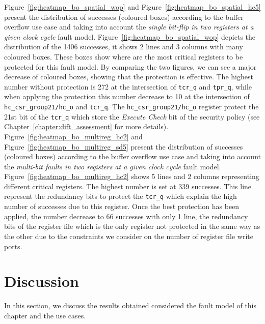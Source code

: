 Figure~\ref{fig:heatmap_bo_spatial_wop} and Figure~\ref{fig:heatmap_bo_spatial_hc5} present the distribution of successes (coloured boxes) according to the buffer overflow use case and taking into account the \textit{single bit-flip in two registers at a given clock cycle} fault model. Figure~\ref{fig:heatmap_bo_spatial_wop} depicts the distribution of the 1406 successes, it shows 2 lines and 3 columns with many coloured boxes. These boxes show where are the most critical registers to be protected for this fault model. By comparing the two figures, we can see a major decrease of coloured boxes, showing that the protection is effective. The highest number without protection is 272 at the intersection of \texttt{tcr\_q} and \texttt{tpr\_q}, while when applying the protection this number decrease to 10 at the intersection of \texttt{hc\_csr\_group21/hc\_o} and \texttt{tcr\_q}. The \texttt{hc\_csr\_group21/hc\_o} register protect the 21st bit of the \texttt{tcr\_q} which store the \textit{Execute Check} bit of the security policy (see Chapter~\ref{chapter:dift_assessment} for more details).
Figure~\ref{fig:heatmap_bo_multireg_hc2} and Figure~\ref{fig:heatmap_bo_multireg_sd5} present the distribution of successes (coloured boxes) according to the buffer overflow use case and taking into account the \textit{multi-bit faults in two registers at a given clock cycle} fault model. Figure~\ref{fig:heatmap_bo_multireg_hc2} shows 5 lines and 2 columns representing different critical registers. The highest number is set at 339 successes. This line represent the redundancy bits to protect the \texttt{tcr\_q} which explain the high number of successes due to this register. Once the best protection has been applied, the number decrease to 66 successes with only 1 line, the redundancy bits of the register file which is the only register not protected in the same way as the other due to the constraints we consider on the number of register file write ports.

\section{Discussion}
\label{section:chap6_discussion}

In this section, we discuss the results obtained considered the fault model of this chapter and the use cases.

